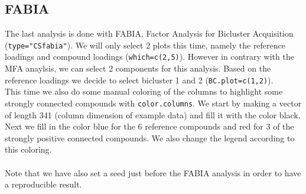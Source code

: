 \documentclass[a4paper]{article}\usepackage[]{graphicx}\usepackage[]{color}
\begin{document}
\subsection{FABIA}
The last analysis is done with FABIA, Factor Analysis for Bicluster Acquisition
(\texttt{type="CSfabia"}). We will only select 2 plots this time, namely the
reference loadings and compound loadings (\texttt{which=c(2,5)}). However in
contrary with the MFA anaylsis, we can select 2 components for this analysis.
Based on the reference loadings we decide to select bicluster 1 and 2
(\texttt{BC.plot=c(1,2)}). \\
This time we also do some manual coloring of the columns to highlight some
strongly connected compounds with \texttt{color.columns}. We start by making a vector of length
341 (column dimension of example data) and fill it with the color black. Next we fill in the
color blue for the 6 reference compounds and red for 3 of the strongly positive
connected compounds. We also change the legend according to this coloring.\\ \\
Note that we have also set a seed just before the FABIA analysis in order to
have a reproducible result.
\end{document}
